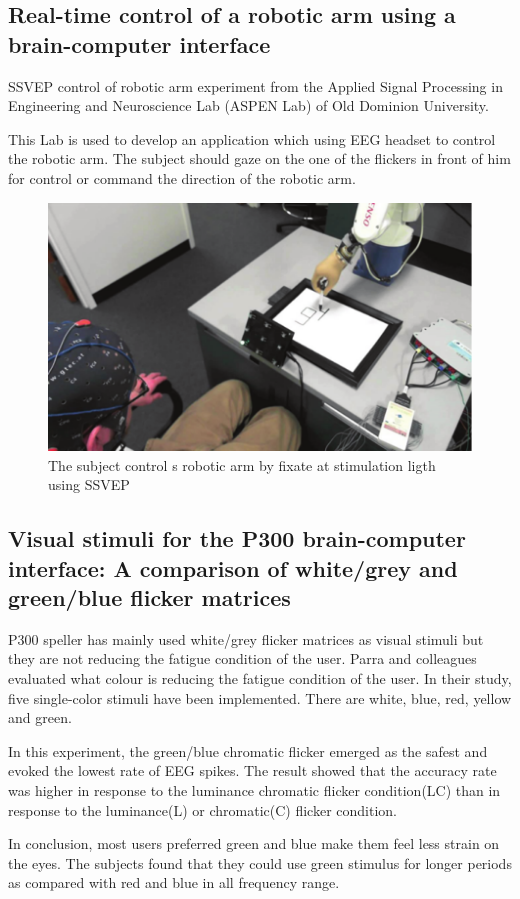 \subsection {Real-time control of a robotic arm using a brain-computer interface\cite{ref2}}

\hspace{1.5cm} SSVEP control of robotic arm experiment from the Applied Signal Processing in Engineering and Neuroscience Lab (ASPEN Lab) of Old Dominion University.\par
This Lab is used to develop an application which using EEG headset to control the robotic arm. The subject should gaze on the one of the flickers in front of him for control or command the direction of the robotic arm.
\begin{figure}[ht]
	\centering
  	\includegraphics[scale = 0.70]{chapter2/22.pdf}
  	\caption{The subject control s robotic arm by fixate at stimulation ligth using SSVEP}
\end{figure}
\newpage

\subsection {Visual stimuli for the P300 brain-computer interface: A comparison of white/grey and green/blue flicker matrices\cite{ref3}}

\hspace{1.5cm}  P300 speller has mainly used white/grey flicker matrices as visual stimuli but they are not reducing the fatigue condition of the user. Parra and colleagues evaluated what colour is reducing the fatigue condition of the user. In their study, five single-color stimuli have been implemented. There are white, blue, red, yellow and green.\par
In this experiment, the green/blue chromatic flicker emerged as the safest and evoked the lowest rate of EEG spikes. The result showed that the accuracy rate was higher in response to the luminance chromatic flicker condition(LC) than in response to the luminance(L) or chromatic(C) flicker condition.\par
In conclusion, most users preferred green and blue make them feel less strain on the eyes. The subjects found that they could use green stimulus for longer periods as compared with red and blue in all frequency range.

